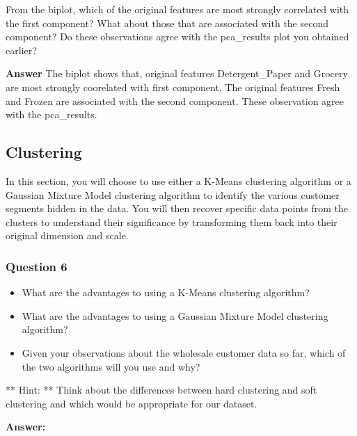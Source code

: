 \documentclass[11pt]{article}
\providecommand{\tightlist}{%
      \setlength{\itemsep}{0pt}\setlength{\parskip}{0pt}}
\begin{document}
From the biplot, which of the original features are most strongly
correlated with the first component? What about those that are
associated with the second component? Do these observations agree with
the pca\_results plot you obtained earlier?

\textbf{Answer} The biplot shows that, original features
Detergent\_Paper and Grocery are most strongly coorelated with first
component. The original features Fresh and Frozen are associated with
the second component. These observation agree with the pca\_results.

    \hypertarget{clustering}{%
\subsection{Clustering}\label{clustering}}

In this section, you will choose to use either a K-Means clustering
algorithm or a Gaussian Mixture Model clustering algorithm to identify
the various customer segments hidden in the data. You will then recover
specific data points from the clusters to understand their significance
by transforming them back into their original dimension and scale.

    \hypertarget{question-6}{%
\subsubsection{Question 6}\label{question-6}}

\begin{itemize}
\tightlist
\item
  What are the advantages to using a K-Means clustering algorithm?
\item
  What are the advantages to using a Gaussian Mixture Model clustering
  algorithm?
\item
  Given your observations about the wholesale customer data so far,
  which of the two algorithms will you use and why?
\end{itemize}

** Hint: ** Think about the differences between hard clustering and soft
clustering and which would be appropriate for our dataset.

    \textbf{Answer:}
\end{document}
